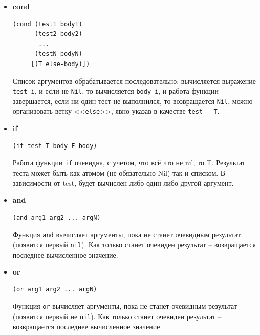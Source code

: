 \documentclass[a4paper,14pt, unknownkeysallowed]{extreport}
\begin{document}
\begin{itemize}
	\item \textbf{cond}
	

	\begin{center}
	\captionsetup{justification=raggedright,singlelinecheck=off}
	\begin{lstlisting}
(cond (test1 body1) 
	  (test2 body2)
	   ...
	  (testN bodyN)
	 [(T else-body)])
	\end{lstlisting}
	\end{center}

	Список аргументов обрабатывается последовательно: вычисляется выражение \texttt{test\_i}, и если не \texttt{Nil}, то вычисляется \texttt{body\_i}, и работа функции завершается, если ни один тест не выполнился, то возвращается \texttt{Nil}, можно организовать ветку <<\texttt{else}>>, явно указав в качестве \texttt{test -- Т}.

	\item \textbf{if}
	
	\begin{center}
	\captionsetup{justification=raggedright,singlelinecheck=off}
	\begin{lstlisting}
(if test T-body F-body)
	\end{lstlisting}
	\end{center}

	Работа функции \texttt{if} очевидна, с учетом, что всё что не nil, то T. Результат теста может быть как атомом (не обязательно Nil) так и списком. В зависимости от test, будет вычислен либо один либо другой аргумент.

	\item \textbf{and}
	
	\begin{center}
	\captionsetup{justification=raggedright,singlelinecheck=off}
	\begin{lstlisting}
(and arg1 arg2 ... argN) 
	\end{lstlisting}
	\end{center}

	Функция \texttt{and} вычисляет аргументы, пока не станет очевидным результат (появится первый \texttt{nil}). Как только станет очевиден результат -- возвращается последнее вычисленное значение.

	\item \textbf{or}
	
	\begin{center}
	\captionsetup{justification=raggedright,singlelinecheck=off}
	\begin{lstlisting}
(or arg1 arg2 ... argN)
	\end{lstlisting}
	\end{center}

	Функция \texttt{or} вычисляет аргументы, пока не станет очевидным результат (появится первый не \texttt{nil}). Как только станет очевиден результат -- возвращается последнее вычисленное значение.

\end{itemize}
\end{document}
